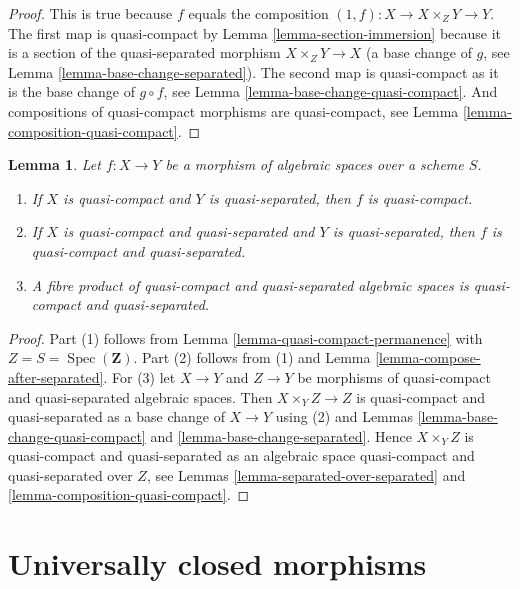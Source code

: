 \documentclass{stacks-project}
\theoremstyle{plain}
\newtheorem{lemma}[subsection]{Lemma}
\theoremstyle{definition}
\theoremstyle{remark}
\numberwithin{equation}{subsection}
\def\Spec{\mathop{\mathrm{Spec}}}
\begin{document}
\begin{proof}
This is true because $f$ equals the composition
$(1, f) : X \to X \times_Z Y \to Y$. The first map
is quasi-compact by Lemma \ref{lemma-section-immersion}
because it is a section of the quasi-separated morphism $X \times_Z Y \to X$
(a base change of $g$, see Lemma \ref{lemma-base-change-separated}).
The second map is quasi-compact as it
is the base change of $g \circ f$, see
Lemma \ref{lemma-base-change-quasi-compact}.
And compositions of quasi-compact
morphisms are quasi-compact, see Lemma \ref{lemma-composition-quasi-compact}.
\end{proof}

\begin{lemma}
\label{lemma-quasi-compact-quasi-separated-permanence}
Let $f : X \to Y$ be a morphism of algebraic spaces
over a scheme $S$.
\begin{enumerate}
\item If $X$ is quasi-compact and $Y$ is quasi-separated, then $f$ is
quasi-compact.
\item If $X$ is quasi-compact and quasi-separated and $Y$ is quasi-separated,
then $f$ is quasi-compact and quasi-separated.
\item A fibre product of quasi-compact and quasi-separated algebraic spaces
is quasi-compact and quasi-separated.
\end{enumerate}
\end{lemma}

\begin{proof}
Part (1) follows from
Lemma \ref{lemma-quasi-compact-permanence}
with $Z = S = \Spec(\mathbf{Z})$.
Part (2) follows from (1) and
Lemma \ref{lemma-compose-after-separated}.
For (3) let $X \to Y$ and $Z \to Y$ be morphisms
of quasi-compact and quasi-separated algebraic spaces. Then
$X \times_Y Z \to Z$ is quasi-compact and quasi-separated as a
base change of $X \to Y$ using (2) and
Lemmas \ref{lemma-base-change-quasi-compact} and
\ref{lemma-base-change-separated}.
Hence $X \times_Y Z$ is quasi-compact and quasi-separated as
an algebraic space quasi-compact and quasi-separated over
$Z$, see
Lemmas \ref{lemma-separated-over-separated} and
\ref{lemma-composition-quasi-compact}.
\end{proof}


\section{Universally closed morphisms}
\label{section-universally-closed}
\end{document}
